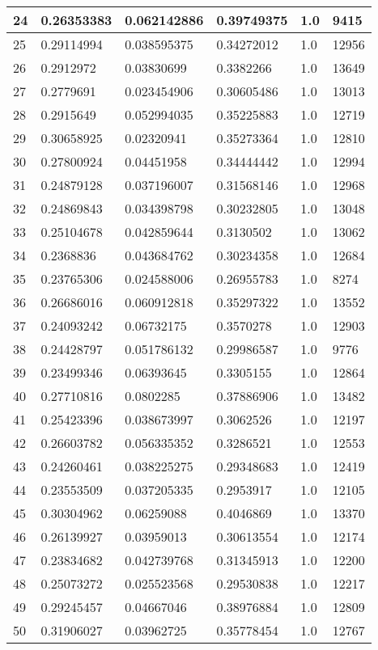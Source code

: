 \begin{longtable}{|l|l|l|l|l|l|}
24 & 0.26353383 & 0.062142886 & 0.39749375 & 1.0 & 9415 \\ \hline 
25 & 0.29114994 & 0.038595375 & 0.34272012 & 1.0 & 12956 \\ \hline 
26 & 0.2912972 & 0.03830699 & 0.3382266 & 1.0 & 13649 \\ \hline 
27 & 0.2779691 & 0.023454906 & 0.30605486 & 1.0 & 13013 \\ \hline 
28 & 0.2915649 & 0.052994035 & 0.35225883 & 1.0 & 12719 \\ \hline 
29 & 0.30658925 & 0.02320941 & 0.35273364 & 1.0 & 12810 \\ \hline 
30 & 0.27800924 & 0.04451958 & 0.34444442 & 1.0 & 12994 \\ \hline 
31 & 0.24879128 & 0.037196007 & 0.31568146 & 1.0 & 12968 \\ \hline 
32 & 0.24869843 & 0.034398798 & 0.30232805 & 1.0 & 13048 \\ \hline 
33 & 0.25104678 & 0.042859644 & 0.3130502 & 1.0 & 13062 \\ \hline 
34 & 0.2368836 & 0.043684762 & 0.30234358 & 1.0 & 12684 \\ \hline 
35 & 0.23765306 & 0.024588006 & 0.26955783 & 1.0 & 8274 \\ \hline 
36 & 0.26686016 & 0.060912818 & 0.35297322 & 1.0 & 13552 \\ \hline 
37 & 0.24093242 & 0.06732175 & 0.3570278 & 1.0 & 12903 \\ \hline 
38 & 0.24428797 & 0.051786132 & 0.29986587 & 1.0 & 9776 \\ \hline 
39 & 0.23499346 & 0.06393645 & 0.3305155 & 1.0 & 12864 \\ \hline 
40 & 0.27710816 & 0.0802285 & 0.37886906 & 1.0 & 13482 \\ \hline 
41 & 0.25423396 & 0.038673997 & 0.3062526 & 1.0 & 12197 \\ \hline 
42 & 0.26603782 & 0.056335352 & 0.3286521 & 1.0 & 12553 \\ \hline 
43 & 0.24260461 & 0.038225275 & 0.29348683 & 1.0 & 12419 \\ \hline 
44 & 0.23553509 & 0.037205335 & 0.2953917 & 1.0 & 12105 \\ \hline 
45 & 0.30304962 & 0.06259088 & 0.4046869 & 1.0 & 13370 \\ \hline 
46 & 0.26139927 & 0.03959013 & 0.30613554 & 1.0 & 12174 \\ \hline 
47 & 0.23834682 & 0.042739768 & 0.31345913 & 1.0 & 12200 \\ \hline 
48 & 0.25073272 & 0.025523568 & 0.29530838 & 1.0 & 12217 \\ \hline 
49 & 0.29245457 & 0.04667046 & 0.38976884 & 1.0 & 12809 \\ \hline 
50 & 0.31906027 & 0.03962725 & 0.35778454 & 1.0 & 12767 \\ \hline 
\end{longtable}